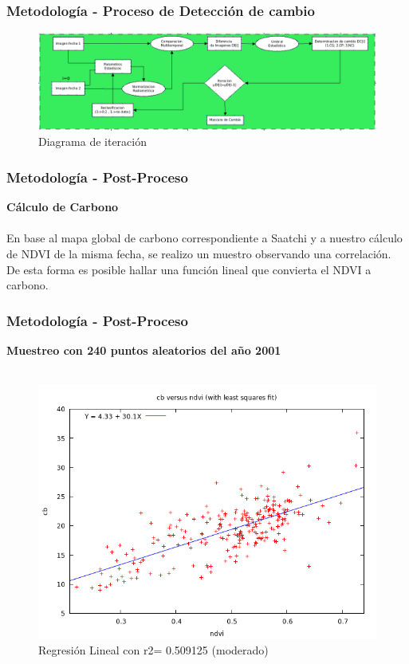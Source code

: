 \documentclass[xcolor=table]{beamer}
\begin{document}
\begin{frame}
	\frametitle{Metodolog\'ia - Proceso de Detecci\'on de cambio}
\begin{figure}
\centering
\includegraphics[width=0.8\linewidth, height=0.5\textheight]{imagenes/iteracion}
\caption{Diagrama de iteraci\'on}
\label{fig:iteracion}
\end{figure}


\end{frame}


\begin{frame}
	\frametitle{Metodolog\'ia - Post-Proceso}
	\textbf{C\'alculo de Carbono}\\~\\	
	En base al mapa global de carbono correspondiente a Saatchi y a nuestro c\'alculo de NDVI de la misma fecha, se realizo un muestro observando una correlaci\'on. De esta forma es posible hallar una funci\'on lineal que convierta el NDVI a carbono.
	
\end{frame}

\begin{frame}
	\frametitle{Metodolog\'ia - Post-Proceso}
	\textbf{Muestreo con 240 puntos aleatorios del a\~{n}o 2001}\\~\\	
	\begin{figure}
		\centering
		\includegraphics[width=0.7\linewidth, height=0.6\textheight]{imagenes/ndviCarb}
		\caption{Regresi\'on Lineal con r2= 0.509125 (moderado)}
		\label{fig:ndviCarb}
	\end{figure}
	
	
\end{frame}
\end{document}
